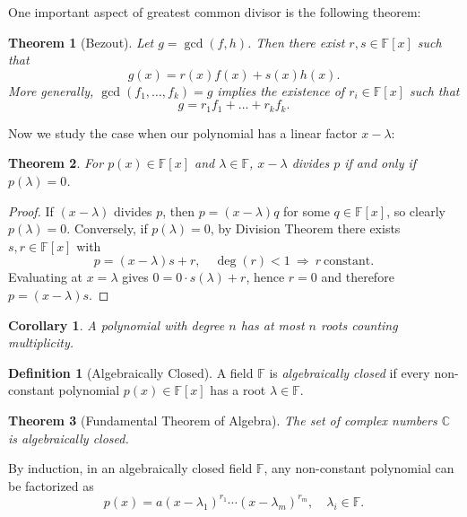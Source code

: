 \documentclass[11pt,openany]{book}
\theoremstyle{plain}
\newtheorem{theorem}{Theorem}[chapter]
\newtheorem{corollary}[corollary]{Corollary}
\theoremstyle{definition}
\newtheorem{definition}[definition]{Definition}
\theoremstyle{remark}
\begin{document}
One important aspect of greatest common divisor is the following theorem:
\begin{theorem} [Bezout] \label{thm:bezout}
Let $g = \gcd(f,h)$. Then there exist $r,s \in \mathbb{F}[x]$ such that
\[
    g(x) = r(x)f(x) + s(x)h(x).
\]
More generally, $\gcd(f_1, \dots, f_k) = g$ implies the existence of $r_i \in \mathbb{F}[x]$ such that
\[
    g = r_1 f_1 + \dots + r_k f_k.
\]
\end{theorem}

Now we study the case when our polynomial has a linear factor $x - \lambda$:
\begin{theorem}  
For $p(x) \in \mathbb{F}[x]$ and $\lambda \in \mathbb{F}$, $x - \lambda$ divides $p$ if and only if $p(\lambda) = 0$.
\end{theorem}
\begin{proof}  
If $(x - \lambda)$ divides $p$, then $p = (x - \lambda)q$ for some $q \in \mathbb{F}[x]$, so clearly $p(\lambda) = 0$.  
Conversely, if $p(\lambda) = 0$, by Division Theorem there exists $s,r \in \mathbb{F}[x]$ with
\[
    p = (x - \lambda)s + r, \quad \deg(r) < 1 \ \Rightarrow\ r \ \text{constant}.
\]
Evaluating at $x=\lambda$ gives $0 = 0 \cdot s(\lambda) + r$, hence $r=0$ and therefore $p = (x - \lambda)s$.
\end{proof}

\begin{corollary}  
A polynomial with degree $n$ has at most $n$ roots counting multiplicity.
\end{corollary}

\begin{definition} [Algebraically Closed] 
A field $\mathbb{F}$ is \textit{algebraically closed} if every non-constant polynomial $p(x) \in \mathbb{F}[x]$ has a root $\lambda \in \mathbb{F}$.
\end{definition}

\begin{theorem} [Fundamental Theorem of Algebra]  
The set of complex numbers $\mathbb{C}$ is algebraically closed.
\end{theorem}

By induction, in an algebraically closed field $\mathbb{F}$, any non-constant polynomial can be factorized as
\[
    p(x) = a(x - \lambda_1)^{r_1} \cdots (x - \lambda_m)^{r_m}, \quad \lambda_i \in \mathbb{F}.
\]





\end{document}
